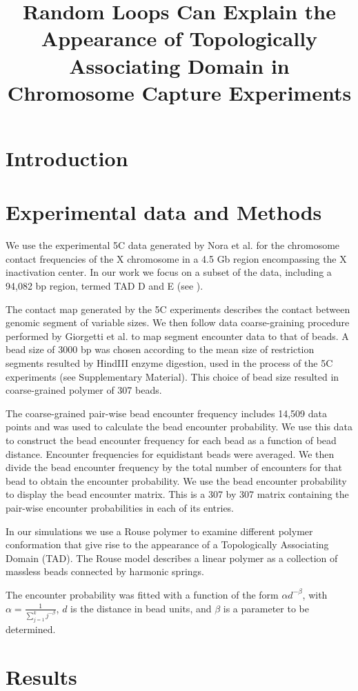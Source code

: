 \documentclass[12pt]{paper}
\begin{document}
\title{Random Loops Can Explain the Appearance of Topologically Associating Domain in Chromosome Capture Experiments}
\maketitle

\section{Introduction}

\section{Experimental data and Methods}\label{Methods}

We use the experimental 5C data generated by Nora et al.\cite{Nora2012} for the chromosome contact frequencies of the X chromosome in a 4.5 Gb region encompassing the X inactivation center. In our work we focus on a subset of the data, including a 94,082 bp region, termed TAD D and E (see \cite{Nora2012}). 

The contact map generated by the 5C experiments describes the contact between genomic segment of variable sizes. We then follow data coarse-graining procedure performed by Giorgetti et al.\cite{Giorgetti2014} to map segment encounter data to that of beads. A bead size of 3000 bp was chosen according to the mean size of restriction segments resulted by HindIII enzyme digestion, used in the process of the 5C experiments (see \cite{Giorgetti2014} Supplementary Material). This choice of bead size resulted in coarse-grained polymer of 307 beads. 

The coarse-grained pair-wise bead encounter frequency includes 14,509 data points and was used to calculate the bead encounter probability. We use this data to construct the bead encounter frequency for each bead as a function of bead distance. Encounter frequencies for equidistant beads were averaged. We then divide the bead encounter frequency by the total number of encounters for that bead to obtain the encounter probability. We use the bead encounter probability to display the bead encounter matrix. This is a 307 by 307 matrix containing the pair-wise encounter probabilities in each of its entries.


In our simulations we use a Rouse polymer to examine different polymer conformation that give rise to the appearance of a Topologically Associating Domain (TAD). The Rouse model describes a linear polymer as a collection of massless beads connected by harmonic springs. 




The encounter probability was fitted with a function of the form  $\alpha d^{-\beta}$, with $\alpha = \frac{1}{\sum_{j=1}^k j^{-\beta}}$, $d$ is the distance in bead units, and $\beta$ is a parameter to be determined.



\section{Results}\label{Results}



\end{document}
